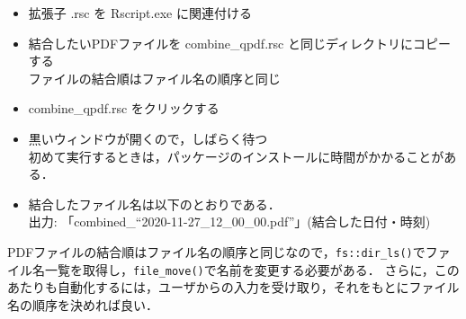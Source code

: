 \documentclass[
]{article}
\providecommand{\tightlist}{%
  \setlength{\itemsep}{0pt}\setlength{\parskip}{0pt}}
\begin{document}
\begin{itemize}
\tightlist
\item
  拡張子 .rsc を Rscript.exe に関連付ける\\
\item
  結合したいPDFファイルを combine\_qpdf.rsc と同じディレクトリにコピーする\\
  ファイルの結合順はファイル名の順序と同じ\\
\item
  combine\_qpdf.rsc をクリックする\\
\item
  黒いウィンドウが開くので，しばらく待つ\\
  初めて実行するときは，パッケージのインストールに時間がかかることがある．\\
\item
  結合したファイル名は以下のとおりである．\\
  出力: 「combined\_``2020-11-27\_12\_00\_00.pdf''」(結合した日付・時刻)
\end{itemize}

PDFファイルの結合順はファイル名の順序と同じなので，\texttt{fs::dir\_ls()}でファイル名一覧を取得し，\texttt{file\_move()}で名前を変更する必要がある．
さらに，このあたりも自動化するには，ユーザからの入力を受け取り，それをもとにファイル名の順序を決めれば良い．
\end{document}
